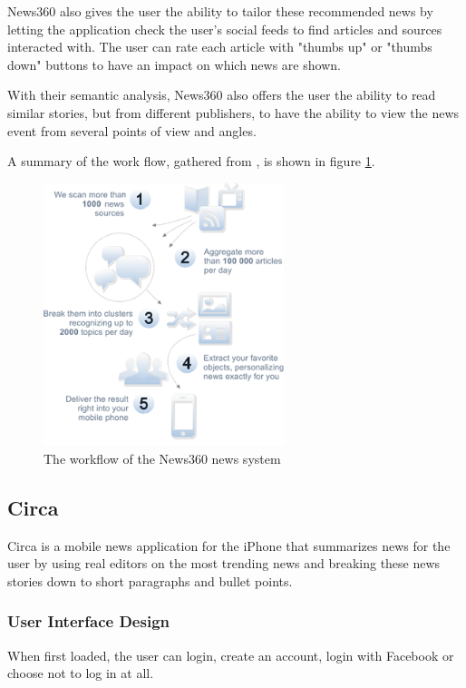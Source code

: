 News360 also gives the user the ability to tailor these recommended news by letting the application check the user's social feeds to find articles and sources interacted with. The user can rate each article with "thumbs up" or "thumbs down" buttons to have an impact on which news are shown.

With their semantic analysis, News360 also offers the user the ability to read similar stories, but from different publishers, to have the ability to view the news event from several points of view and angles.

A summary of the work flow, gathered from \cite{news360_technology}, is shown in figure \ref{tech_news360_workflow}.



\begin{figure}[!htbp]
\centering
\includegraphics[width=70mm]{GFX/tech/news360workflow.png}
\caption{The workflow of the News360 news system}
\label{tech_news360_workflow}
\end{figure}


\subsection{Circa}
Circa is a mobile news application for the iPhone that summarizes news for the user by using real editors on the most trending news and breaking these news stories down to short paragraphs and bullet points\cite{circa_about}.

\subsubsection{User Interface Design}
When first loaded, the user can login, create an account, login with Facebook or choose not to log in at all.

